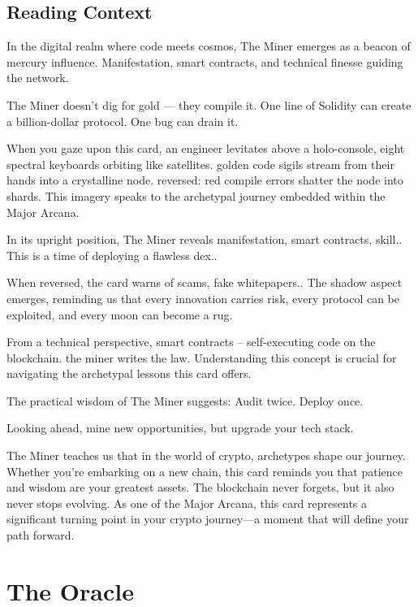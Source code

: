 \documentclass[11pt,oneside]{book}
\begin{document}
\begin{minipage}[t]{0.55\textwidth}
  \subsection*{Reading Context}
  In the digital realm where code meets cosmos, The Miner emerges as a beacon of mercury influence. Manifestation, smart contracts, and technical finesse guiding the network.

  The Miner doesn't dig for gold — they compile it. One line of Solidity can create a billion-dollar protocol. One bug can drain it.

  When you gaze upon this card, an engineer levitates above a holo-console, eight spectral keyboards orbiting like satellites. golden code sigils stream from their hands into a crystalline node. reversed: red compile errors shatter the node into shards. This imagery speaks to the archetypal journey embedded within the Major Arcana.

  In its upright position, The Miner reveals manifestation, smart contracts, skill.. This is a time of deploying a flawless dex..

  When reversed, the card warns of scams, fake whitepapers.. The shadow aspect emerges, reminding us that every innovation carries risk, every protocol can be exploited, and every moon can become a rug.

  From a technical perspective, smart contracts – self-executing code on the blockchain. the miner writes the law. Understanding this concept is crucial for navigating the archetypal lessons this card offers.

  The practical wisdom of The Miner suggests: Audit twice. Deploy once.

  Looking ahead, mine new opportunities, but upgrade your tech stack.

  The Miner teaches us that in the world of crypto, archetypes shape our journey. Whether you're embarking on a new chain, this card reminds you that patience and wisdom are your greatest assets. The blockchain never forgets, but it also never stops evolving. As one of the Major Arcana, this card represents a significant turning point in your crypto journey—a moment that will define your path forward.

\end{minipage}

\newpage
\section*{The Oracle}
\end{document}
